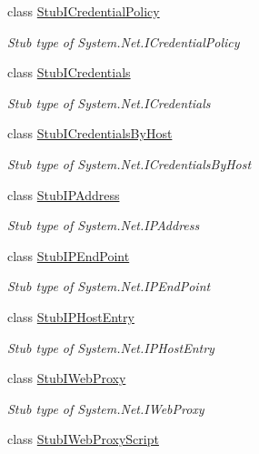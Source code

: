 \begin{DoxyCompactItemize}
class \hyperlink{class_system_1_1_net_1_1_fakes_1_1_stub_i_credential_policy}{Stub\-I\-Credential\-Policy}
\begin{DoxyCompactList}\small\item\em Stub type of System.\-Net.\-I\-Credential\-Policy\end{DoxyCompactList}\item 
class \hyperlink{class_system_1_1_net_1_1_fakes_1_1_stub_i_credentials}{Stub\-I\-Credentials}
\begin{DoxyCompactList}\small\item\em Stub type of System.\-Net.\-I\-Credentials\end{DoxyCompactList}\item 
class \hyperlink{class_system_1_1_net_1_1_fakes_1_1_stub_i_credentials_by_host}{Stub\-I\-Credentials\-By\-Host}
\begin{DoxyCompactList}\small\item\em Stub type of System.\-Net.\-I\-Credentials\-By\-Host\end{DoxyCompactList}\item 
class \hyperlink{class_system_1_1_net_1_1_fakes_1_1_stub_i_p_address}{Stub\-I\-P\-Address}
\begin{DoxyCompactList}\small\item\em Stub type of System.\-Net.\-I\-P\-Address\end{DoxyCompactList}\item 
class \hyperlink{class_system_1_1_net_1_1_fakes_1_1_stub_i_p_end_point}{Stub\-I\-P\-End\-Point}
\begin{DoxyCompactList}\small\item\em Stub type of System.\-Net.\-I\-P\-End\-Point\end{DoxyCompactList}\item 
class \hyperlink{class_system_1_1_net_1_1_fakes_1_1_stub_i_p_host_entry}{Stub\-I\-P\-Host\-Entry}
\begin{DoxyCompactList}\small\item\em Stub type of System.\-Net.\-I\-P\-Host\-Entry\end{DoxyCompactList}\item 
class \hyperlink{class_system_1_1_net_1_1_fakes_1_1_stub_i_web_proxy}{Stub\-I\-Web\-Proxy}
\begin{DoxyCompactList}\small\item\em Stub type of System.\-Net.\-I\-Web\-Proxy\end{DoxyCompactList}\item 
class \hyperlink{class_system_1_1_net_1_1_fakes_1_1_stub_i_web_proxy_script}{Stub\-I\-Web\-Proxy\-Script}

\end{DoxyCompactItemize}
